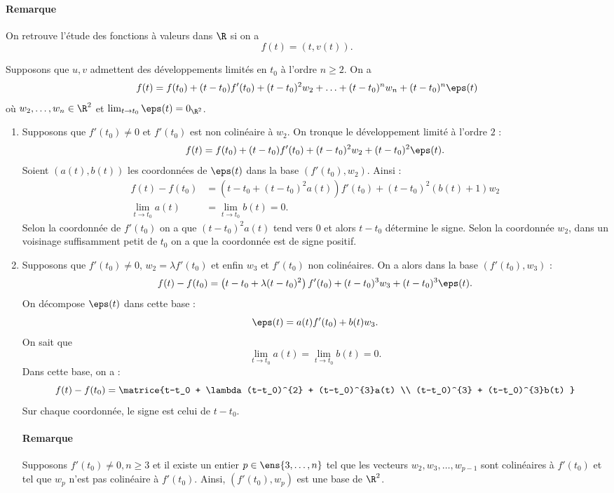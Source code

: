 \documentclass{mybourbaki}
\begin{document}
\paragraph{Remarque}On retrouve l'étude des fonctions à valeurs dans $\R$ si on a \[f(t) = (t,v(t)). \]

Supposons que $u,v$ admettent des développements limités en $t_0$ à l'ordre $n\geq 2$. On a \[f(t) = f(t_0) + (t-t_0)f'(t_0) + (t-t_0)^{2}w_2 + \ldots + (t-t_0)^{n}w_n + (t-t_0)^{n}\eps(t)\]où $w_2,\ldots,w_n\in \R^{2}$ et $\lim_{t\to t_0}\eps(t) = 0_{\R^{2}}$.
\begin{enumerate}
\item Supposons que $f'(t_0)\neq 0$ et $f'(t_0)$ est non colinéaire à $w_2$. On tronque le développement limité à l'ordre $2$  : \[ f(t) = f(t_0) + (t-t_0)f'(t_0) + (t-t_0)^{2}w_2 + (t-t_0)^{2}\eps(t).\]Soient $(a(t),b(t))$ les coordonnées de $\eps(t)$ dans la base $(f'(t_0),w_2)$. Ainsi :
\begin{align*}
f(t) - f(t_0) &= \left(t-t_0 + (t-t_0)^{2}a(t)\right)f'(t_0) + (t-t_0)^{2}(b(t) +1)w_2\\
\lim_{t\to t_0} a(t) &= \lim_{t\to t_0} b(t) = 0.
\end{align*}
Selon la coordonnée de $f'(t_0)$ on a que $(t-t_0)^{2}a(t)$ tend vers $0$ et alors $t-t_0$ détermine le signe. Selon la coordonnée $w_2$, dans un voisinage suffisamment petit de $t_0$ on a que la coordonnée est de signe positif.
\item Supposons que $f'(t_0)\neq 0$, $w_2 = \lambda f'(t_0)$ et enfin $w_3$ et $f'(t_0)$ non colinéaires. On a alors dans la base $(f'(t_0),w_3)$ : \[f(t) - f(t_0) = \left(t-t_0 + \lambda(t-t_0)^{2}\right)f'(t_0) + (t-t_0)^{3}w_3 + (t-t_0)^{3}\eps(t). \]
On décompose $\eps(t)$ dans cette base : \[\eps(t) = a(t) f'(t_0) + b(t) w_3.\]On sait que \[ \lim_{t\to t_0}a(t) = \lim_{t\to t_0}b(t) = 0.\]
Dans cette base, on a : \[ f(t) - f(t_0) = \matrice{t-t_0 + \lambda(t-t_0)^{2} + (t-t_0)^{3}a(t) \\ (t-t_0)^{3} + (t-t_0)^{3}b(t) }\]
Sur chaque coordonnée, le signe est celui de $t-t_0$.


\paragraph{Remarque}Supposons $f'(t_0)\neq 0, n\geq 3$ et il existe un entier $p\in\ens{3,\ldots,n}$ tel que les vecteurs $w_2,w_3,\ldots,w_{p-1}$ sont colinéaires à $f'(t_0)$ et tel que $w_p$ n'est pas colinéaire à $f'(t_0)$. Ainsi, $(f'(t_0),w_p)$ est une base de $\R^{2}$.


\end{enumerate}
\end{document}
